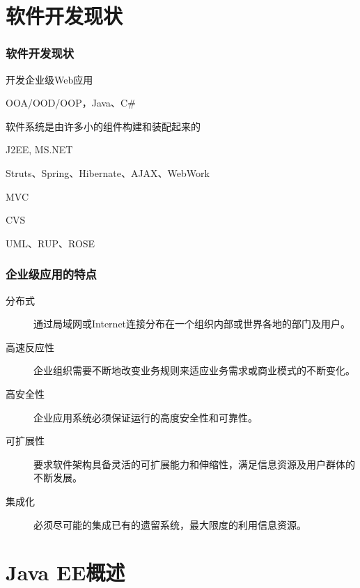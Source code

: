 \section{软件开发现状}

\begin{frame}[fragile] %
  \frametitle{软件开发现状}

  \begin{description}[<+-|alert@+>]
  \item[\fbox{面向Internet}] 开发企业级Web应用
  \item[\fbox{面向对象}] OOA/OOD/OOP，Java、C\#
  \item[\fbox{面向组件}] 软件系统是由许多小的组件构建和装配起来的
  \item[\fbox{采用标准规范开发}] J2EE, MS.NET
  \item[\fbox{全面采用框架技术}] Struts、Spring、Hibernate、AJAX、WebWork
  \item[\fbox{软件系统采用分层结构和设计模式}] MVC
  \item[\fbox{工厂化流水线开发模式}] CVS
  \item[\fbox{可视化软件建模}] UML、RUP、ROSE
  \end{description}
\end{frame}

\begin{frame}[fragile]
  \frametitle{企业级应用的特点}

  \begin{description}
  \item[分布式] 通过局域网或Internet连接分布在一个组织内部或世界各地的部门及用户。
  \item[高速反应性] 企业组织需要不断地改变业务规则来适应业务需求或商业模式的不断变化。
  \item[高安全性] 企业应用系统必须保证运行的高度安全性和可靠性。
  \item[可扩展性] 要求软件架构具备灵活的可扩展能力和伸缩性，满足信息资源及用户群体的不断发展。
  \item[集成化] 必须尽可能的集成已有的遗留系统，最大限度的利用信息资源。
  \end{description}
\end{frame}

\section{Java EE概述}

